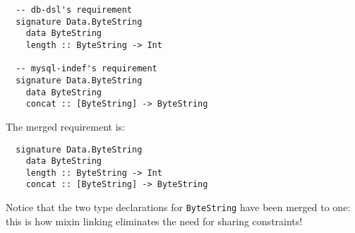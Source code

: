 \begin{verbatim}
  -- db-dsl's requirement
  signature Data.ByteString
    data ByteString
    length :: ByteString -> Int

  -- mysql-indef's requirement
  signature Data.ByteString
    data ByteString
    concat :: [ByteString] -> ByteString
\end{verbatim}
%
The merged requirement is:

\begin{verbatim}
  signature Data.ByteString
    data ByteString
    length :: ByteString -> Int
    concat :: [ByteString] -> ByteString
\end{verbatim}
%
Notice that the two type declarations for \verb|ByteString| have been
merged to one: this is how mixin linking eliminates the need
for sharing constraints!
